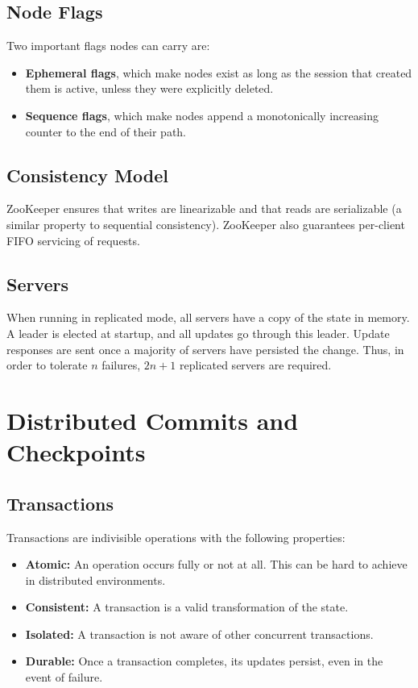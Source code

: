 \documentclass[12pt,titlepage]{article}
\begin{document}
    \subsection{Node Flags}
      Two important flags nodes can carry are:
      \begin{itemize}
        \item \textbf{Ephemeral flags}, which make nodes exist as long as the session that created them is active, unless they were explicitly deleted.
        \item \textbf{Sequence flags}, which make nodes append a monotonically increasing counter to the end of their path.
      \end{itemize}

    \subsection{Consistency Model}
      ZooKeeper ensures that writes are linearizable and that reads are serializable (a similar property to sequential consistency).
      ZooKeeper also guarantees per-client FIFO servicing of requests.

    \subsection{Servers}
      When running in replicated mode, all servers have a copy of the state in memory. A leader is elected at startup, and all updates go
      through this leader. Update responses are sent once a majority of servers have persisted the change. Thus, in order to tolerate $n$
      failures, $2n + 1$ replicated servers are required.

  \newpage

  \section{Distributed Commits and Checkpoints}

    \subsection{Transactions}
      Transactions are indivisible operations with the following properties:
      \begin{itemize}
        \item \textbf{Atomic:} An operation occurs fully or not at all. This can be hard to achieve in distributed environments.
        \item \textbf{Consistent:} A transaction is a valid transformation of the state.
        \item \textbf{Isolated:} A transaction is not aware of other concurrent transactions.
        \item \textbf{Durable:} Once a transaction completes, its updates persist, even in the event of failure.
      \end{itemize}
\end{document}
